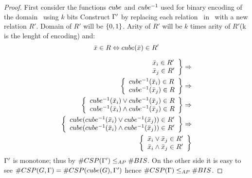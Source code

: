 \begin{proof}
First consider the functions \(cube\) and \(cube^{-1}\) used for
binary encoding of the domain \mrelset\ using \(k\) bits
Construct \(\Gamma'\) by replacing each relation \mR\ in \mrelset\ with a new 
relation \(R'\)\@.
Domain of \(R'\) will be \(\{{{0,1}}\}\)\@. Arity of \(R'\) will be \(k\) times
arity of \(R'\)(k is the lenght of encoding) and:
\[\bar x \in R \Leftrightarrow cube(\bar x)\in R'\]

\begin{eqnarray*}
\left. \begin{array}{l} \bar x_i \in R' \\ \bar x_j \in R'  \end{array}\right \} 
\Rightarrow  \\
\left \{ \begin{array}{l} cube^{-1}(\bar x_i) \in R \\ cube^{-1}(\bar x_j) \in R \end{array} \right \}
\Rightarrow \\
\left \{ \begin{array}{l} cube^{-1}(\bar x_i) \vee cube^{-1}(\bar x_j) \in R \\ cube^{-1}(\bar x_i) \wedge cube^{-1}(\bar x_j) \in R \end{array} \right \}
\Rightarrow  \\
\left \{ \begin{array}{l} cube(cube^{-1}(\bar x_i) \vee cube^{-1}(\bar x_j)) \in R' \\ cube(cube^{-1}(\bar x_i) \wedge cube^{-1}(\bar x_j)) \in R' \end{array} \right \} 
\Rightarrow  \\
\left \{ \begin{array}{l} \bar x_i \vee \bar x_j \in R' \\ \bar x_i \wedge \bar x_j \in R' \end{array} \right \} 
\end{eqnarray*}
\(\Gamma'\) is  monotone; thus by \cite{Tricotomy}
\(\#CSP(\Gamma') \le_{AP} \#BIS\)\@. On the other side it is easy to see 
\(\#CSP(G,\Gamma) = \#CSP(cube(G), \Gamma')\) hence 
\(\#CSP(\Gamma) \le_{AP} \#BIS\)\@.
\end{proof}


